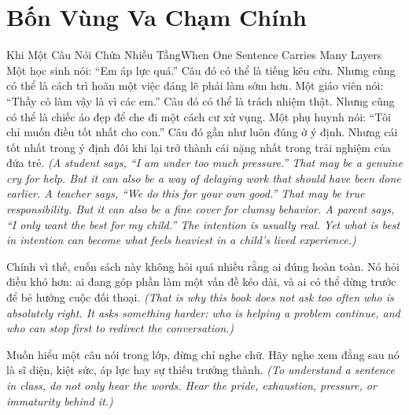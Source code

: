\section*{Bốn Vùng Va Chạm Chính}

\begin{truyen}{Khi Một Câu Nói Chứa Nhiều Tầng}{When One Sentence Carries Many Layers}
Một học sinh nói: ``Em áp lực quá.'' Câu đó có thể là tiếng kêu cứu. Nhưng cũng có thể là cách trì hoãn một việc đáng lẽ phải làm sớm hơn. Một giáo viên nói: ``Thầy cô làm vậy là vì các em.'' Câu đó có thể là trách nhiệm thật. Nhưng cũng có thể là chiếc áo đẹp để che đi một cách cư xử vụng. Một phụ huynh nói: ``Tôi chỉ muốn điều tốt nhất cho con.'' Câu đó gần như luôn đúng ở ý định. Nhưng cái tốt nhất trong ý định đôi khi lại trở thành cái nặng nhất trong trải nghiệm của đứa trẻ.
\textit{(A student says, “I am under too much pressure.” That may be a genuine cry for help. But it can also be a way of delaying work that should have been done earlier. A teacher says, “We do this for your own good.” That may be true responsibility. But it can also be a fine cover for clumsy behavior. A parent says, “I only want the best for my child.” The intention is usually real. Yet what is best in intention can become what feels heaviest in a child's lived experience.)}

Chính vì thế, cuốn sách này không hỏi quá nhiều rằng ai đúng hoàn toàn. Nó hỏi điều khó hơn: ai đang góp phần làm một vấn đề kéo dài, và ai có thể dừng trước để bẻ hướng cuộc đối thoại.
\textit{(That is why this book does not ask too often who is absolutely right. It asks something harder: who is helping a problem continue, and who can stop first to redirect the conversation.)}
\end{truyen}


\begin{baihoc}
Muốn hiểu một câu nói trong lớp, đừng chỉ nghe chữ. Hãy nghe xem đằng sau nó là sĩ diện, kiệt sức, áp lực hay sự thiếu trưởng thành.
\textit{(To understand a sentence in class, do not only hear the words. Hear the pride, exhaustion, pressure, or immaturity behind it.)}
\end{baihoc}


